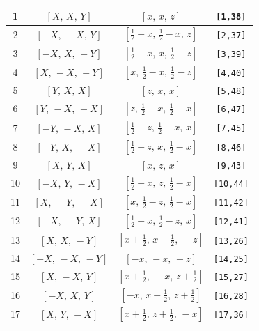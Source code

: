 \documentclass[fleqn,8pt]{jsarticle}
\begin{document}
\begin{longtable}{cccc}
1 & $\left[ X,\, X,\, Y \right]$ & $\left[ x,\, x,\, z \right]$ & {\tt [1,38]} \\ \hline
2 & $\left[ - X,\, - X,\, Y \right]$ & $\left[ \frac{1}{2} - x,\, \frac{1}{2} - x,\, z \right]$ & {\tt [2,37]} \\ \hline
3 & $\left[ - X,\, X,\, - Y \right]$ & $\left[ \frac{1}{2} - x,\, x,\, \frac{1}{2} - z \right]$ & {\tt [3,39]} \\ \hline
4 & $\left[ X,\, - X,\, - Y \right]$ & $\left[ x,\, \frac{1}{2} - x,\, \frac{1}{2} - z \right]$ & {\tt [4,40]} \\ \hline
5 & $\left[ Y,\, X,\, X \right]$ & $\left[ z,\, x,\, x \right]$ & {\tt [5,48]} \\ \hline
6 & $\left[ Y,\, - X,\, - X \right]$ & $\left[ z,\, \frac{1}{2} - x,\, \frac{1}{2} - x \right]$ & {\tt [6,47]} \\ \hline
7 & $\left[ - Y,\, - X,\, X \right]$ & $\left[ \frac{1}{2} - z,\, \frac{1}{2} - x,\, x \right]$ & {\tt [7,45]} \\ \hline
8 & $\left[ - Y,\, X,\, - X \right]$ & $\left[ \frac{1}{2} - z,\, x,\, \frac{1}{2} - x \right]$ & {\tt [8,46]} \\ \hline
9 & $\left[ X,\, Y,\, X \right]$ & $\left[ x,\, z,\, x \right]$ & {\tt [9,43]} \\ \hline
10 & $\left[ - X,\, Y,\, - X \right]$ & $\left[ \frac{1}{2} - x,\, z,\, \frac{1}{2} - x \right]$ & {\tt [10,44]} \\ \hline
11 & $\left[ X,\, - Y,\, - X \right]$ & $\left[ x,\, \frac{1}{2} - z,\, \frac{1}{2} - x \right]$ & {\tt [11,42]} \\ \hline
12 & $\left[ - X,\, - Y,\, X \right]$ & $\left[ \frac{1}{2} - x,\, \frac{1}{2} - z,\, x \right]$ & {\tt [12,41]} \\ \hline
13 & $\left[ X,\, X,\, - Y \right]$ & $\left[ x + \frac{1}{2},\, x + \frac{1}{2},\, - z \right]$ & {\tt [13,26]} \\ \hline
14 & $\left[ - X,\, - X,\, - Y \right]$ & $\left[ - x,\, - x,\, - z \right]$ & {\tt [14,25]} \\ \hline
15 & $\left[ X,\, - X,\, Y \right]$ & $\left[ x + \frac{1}{2},\, - x,\, z + \frac{1}{2} \right]$ & {\tt [15,27]} \\ \hline
16 & $\left[ - X,\, X,\, Y \right]$ & $\left[ - x,\, x + \frac{1}{2},\, z + \frac{1}{2} \right]$ & {\tt [16,28]} \\ \hline
17 & $\left[ X,\, Y,\, - X \right]$ & $\left[ x + \frac{1}{2},\, z + \frac{1}{2},\, - x \right]$ & {\tt [17,36]} \\ \hline

\end{longtable}
\end{document}
